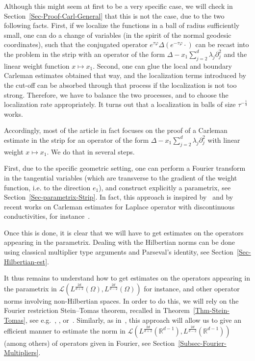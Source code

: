 \documentclass[AHL,Unicode,longabstracts]{cedram}
\newcommand{\scL}{\mathscr{L}}
\newcommand*\R{\mathbb{R}}
\begin{document}
Although this might seem at first to be a very specific case, we will check in Section~\ref{Sec-Proof-Carl-General} that this is not the case, due to the two following facts. First, if we localize the functions in a ball of radius sufficiently small, one can do a change of variables (in the spirit of the normal geodesic coordinates), such that the conjugated operator $e^{\tau \varphi} \Delta\left(e^{-\tau \varphi}\cdot \right)$ can be recast into the problem in the strip with an operator of the form $\Delta - x_1 \sum_{j = 2}^d \lambda_j \partial_{j}^2$ and the linear weight function $x\mapsto x_1$. Second, one can glue the local and boundary Carleman estimates obtained that way, and the localization terms introduced by the cut-off can be absorbed through that process if the localization is not too strong. Therefore, we have to balance the two processes, and to choose the localization rate appropriately. It turns out that a localization in balls of size $\tau^{-\frac{1}{3}}$ works.

Accordingly, most of the article in fact focuses on the proof of a Carleman estimate in the strip for an operator of the form $\Delta - x_1 \sum_{j = 2}^d \lambda_j \partial_{j}^2$ with linear weight $x \mapsto x_1$. We do that in several steps.

First, due to the specific geometric setting, one can perform a Fourier transform in the tangential variables (which are transverse to the gradient of the weight function, i.e. to the direction $e_1$), and construct explicitly a parametrix, see Section~\ref{Sec-parametrix-Strip}. In fact, this approach is inspired by~\cite{koch2001carleman,
Sogge1989uniquecontinuation} and by recent works on Carleman estimates for Laplace operator with discontinuous conductivities, for instance~\cite{LeRousseau2013interface}.

Once this is done, it is clear that we will have to get estimates on the operators appearing in the parametrix. Dealing with the Hilbertian norms can be done using classical multiplier type arguments and Parseval's identity, see Section~\ref{Sec-Hilbertian-est}.

It thus remains to understand how to get estimates on the operators appearing in the parametrix in $\scL(L^{\frac{2d}{d+2}}(\Omega),L^{\frac{2d}{d-2}}(\Omega)) $ for instance, and other operator norms involving non-Hilbertian spaces. In order to do this, we will rely on the Fourier restriction Stein--Tomas theorem, recalled in Theorem~\ref{Thm-Stein-Tomas}, see e.g.~\cite{tomas1975restriction}, \cite[Theorem~2, p.~352]{stein1993harmonic}, or~\cite[Corollary~2.2.2]{sogge2017fourier}. Similarly, as in~\cite{barcelo1988weighted,kenig1987uniform}, this approach will allow us to give an efficient manner to estimate the norm in $\scL(L^{\frac{2d}{d+2}}(\R^{d-1}),L^{\frac{2d}{d-2}}(\R^{d-1})) $ (among others) of operators given in Fourier, see Section~\ref{Subsec-Fourier-Multipliers}.
\end{document}
